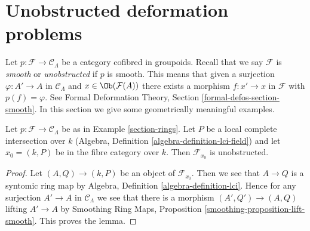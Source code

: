 \section{Unobstructed deformation problems}
\label{section-unobstructed}

\noindent
Let $p : \mathcal{F} \to \mathcal{C}_\Lambda$ be a
category cofibred in groupoids. Recall that we say $\mathcal{F}$
is {\it smooth} or {\it unobstructed} if $p$ is smooth.
This means that given a surjection $\varphi : A' \to A$ in
$\mathcal{C}_\Lambda$ and $x \in \Ob(\mathcal{F}(A))$
there exists a morphism $f : x' \to x$ in $\mathcal{F}$
with $p(f) = \varphi$.
See Formal Deformation Theory, Section \ref{formal-defos-section-smooth}.
In this section we give some geometrically meaningful examples.

\begin{lemma}
\label{lemma-lci-unobstructed}
Let $p : \mathcal{F} \to \mathcal{C}_\Lambda$ be as in
Example \ref{section-rings}. Let $P$ be a local complete
intersection over $k$ (Algebra, Definition \ref{algebra-definition-lci-field})
and let $x_0 = (k, P)$ be in the fibre category over $k$.
Then $\mathcal{F}_{x_0}$ is unobstructed.
\end{lemma}

\begin{proof}
Let $(A, Q) \to (k, P)$ be an object of $\mathcal{F}_{x_0}$.
Then we see that $A \to Q$ is a syntomic ring map by
Algebra, Definition \ref{algebra-definition-lci}.
Hence for any surjection $A' \to A$ in $\mathcal{C}_\Lambda$
we see that there is a morphism $(A', Q') \to (A, Q)$
lifting $A' \to A$ by
Smoothing Ring Maps, Proposition \ref{smoothing-proposition-lift-smooth}.
This proves the lemma.
\end{proof}












